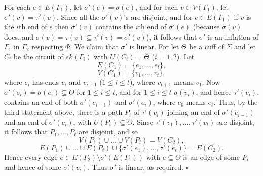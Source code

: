 For each $e\in E(\Gamma_1)$, let $\sigma'(e) = \sigma(e)$, and for each $v\in V(\Gamma_1)$, let $\sigma'(v) = \tau'(v)$. Since all the $\sigma'(v)$'s are disjoint, and for $e\in E(\Gamma_1)$ if $v$ is the $i$th end of $e$ then $\sigma'(v)$ contains the $i$th end of $\sigma'(e)$ (because $\sigma(v)$ does, and $\sigma(v) = \tau(v)\subseteq \tau'(v) = \sigma'(v)$), it follows that $\sigma'$ is an inflation of $\Gamma_1$ in $\Gamma_2$ respecting $\Phi$. We claim that $\sigma'$ is linear. For let $\Theta$ be a cuff of $\Sigma$ and let $C_i$ be the circuit of $sk(\Gamma_i)$ with $U(C_i) = \Theta$ ($i = 1, 2$). Let
\begin{equation*}
E(C_1) = \{e_1, \dots, e_t\},
\end{equation*}
\begin{equation*}
V(C_1) = \{v_1, \dots, v_t\},
\end{equation*}
where $e_i$ has ends $v_i$ and $v_{i+1}$ ($1\le i\le t$), where $v_{t+1}$ means $v_1$. Now $\sigma'(e_i) = \sigma(e_i)\subseteq \Theta$ for $1\le i\le t$, and for $1\le i\le t$ $\sigma(v_i)$, and hence $\tau'(v_i)$, contains an end of both $\sigma'(e_{i-1})$ and $\sigma'(e_i)$, where $e_0$ means $e_t$. Thus, by the third statement above, there is a path $P_i$ of $\tau'(v_i)$ joining an end of $\sigma'(e_{i-1})$ and an end of $\sigma'(e_i)$, with $U(P_i)\subseteq \Theta$. Since $\tau'(v_1), \dots, \tau'(v_t)$ are disjoint, it follows that $P_1, \dots, P_t$ are disjoint, and so
\begin{equation*}
V(P_1)\cup \dots \cup V(P_t) = V(C_2),
\end{equation*}
\begin{equation*}
E(P_1)\cup \dots \cup E(P_t)\cup \{\sigma'(e_1), \dots, \sigma'(e_t)\} = E(C_2).
\end{equation*}
Hence every edge $e\in E(\Gamma_2)\setminus \sigma'(E(\Gamma_1))$ with $e\subseteq \Theta$ is an edge of some $P_i$ and hence of some $\sigma'(v_i)$.  Thus $\sigma'$ is linear, as required. $\square$

